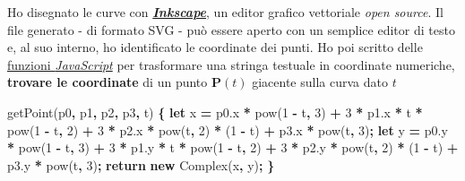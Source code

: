 \documentclass[
]{book}
\newenvironment{Shaded}{\begin{snugshade}}{\end{snugshade}}
\newcommand{\AttributeTok}[1]{\textcolor[rgb]{0.77,0.63,0.00}{#1}}
\newcommand{\ControlFlowTok}[1]{\textcolor[rgb]{0.13,0.29,0.53}{\textbf{#1}}}
\newcommand{\DecValTok}[1]{\textcolor[rgb]{0.00,0.00,0.81}{#1}}
\newcommand{\KeywordTok}[1]{\textcolor[rgb]{0.13,0.29,0.53}{\textbf{#1}}}
\newcommand{\NormalTok}[1]{#1}
\newcommand{\OperatorTok}[1]{\textcolor[rgb]{0.81,0.36,0.00}{\textbf{#1}}}
\newcommand{\VariableTok}[1]{\textcolor[rgb]{0.00,0.00,0.00}{#1}}
\begin{document}
Ho disegnato le curve con \href{https://inkscape.org/}{\emph{\textbf{Inkscape}}}, un editor grafico vettoriale \emph{open source}. Il file generato - di formato SVG - può essere aperto con un semplice editor di testo e, al suo interno, ho identificato le coordinate dei punti. Ho poi scritto delle \href{https://github.com/Bradwave/thesis}{funzioni \emph{JavaScript}} per trasformare una stringa testuale in coordinate numeriche, \textbf{trovare le coordinate} di un punto \(\mathbf{P}(t)\) giacente sulla curva dato \(t\)

\begin{Shaded}
\begin{Highlighting}[]
\AttributeTok{getPoint}\NormalTok{(p0}\OperatorTok{,}\NormalTok{ p1}\OperatorTok{,}\NormalTok{ p2}\OperatorTok{,}\NormalTok{ p3}\OperatorTok{,}\NormalTok{ t) }\OperatorTok{\{}
  \KeywordTok{let}\NormalTok{ x }\OperatorTok{=} \VariableTok{p0}\NormalTok{.}\AttributeTok{x} \OperatorTok{*} \AttributeTok{pow}\NormalTok{(}\DecValTok{1} \OperatorTok{-}\NormalTok{ t}\OperatorTok{,} \DecValTok{3}\NormalTok{) }\OperatorTok{+} \DecValTok{3} \OperatorTok{*} \VariableTok{p1}\NormalTok{.}\AttributeTok{x} \OperatorTok{*}\NormalTok{ t }\OperatorTok{*} \AttributeTok{pow}\NormalTok{(}\DecValTok{1} \OperatorTok{-}\NormalTok{ t}\OperatorTok{,} \DecValTok{2}\NormalTok{)}
    \OperatorTok{+} \DecValTok{3} \OperatorTok{*} \VariableTok{p2}\NormalTok{.}\AttributeTok{x} \OperatorTok{*} \AttributeTok{pow}\NormalTok{(t}\OperatorTok{,} \DecValTok{2}\NormalTok{) }\OperatorTok{*}\NormalTok{ (}\DecValTok{1} \OperatorTok{-}\NormalTok{ t) }\OperatorTok{+} \VariableTok{p3}\NormalTok{.}\AttributeTok{x} \OperatorTok{*} \AttributeTok{pow}\NormalTok{(t}\OperatorTok{,} \DecValTok{3}\NormalTok{)}\OperatorTok{;}
  \KeywordTok{let}\NormalTok{ y }\OperatorTok{=} \VariableTok{p0}\NormalTok{.}\AttributeTok{y} \OperatorTok{*} \AttributeTok{pow}\NormalTok{(}\DecValTok{1} \OperatorTok{-}\NormalTok{ t}\OperatorTok{,} \DecValTok{3}\NormalTok{) }\OperatorTok{+} \DecValTok{3} \OperatorTok{*} \VariableTok{p1}\NormalTok{.}\AttributeTok{y} \OperatorTok{*}\NormalTok{ t }\OperatorTok{*} \AttributeTok{pow}\NormalTok{(}\DecValTok{1} \OperatorTok{-}\NormalTok{ t}\OperatorTok{,} \DecValTok{2}\NormalTok{)}
    \OperatorTok{+} \DecValTok{3} \OperatorTok{*} \VariableTok{p2}\NormalTok{.}\AttributeTok{y} \OperatorTok{*} \AttributeTok{pow}\NormalTok{(t}\OperatorTok{,} \DecValTok{2}\NormalTok{) }\OperatorTok{*}\NormalTok{ (}\DecValTok{1} \OperatorTok{-}\NormalTok{ t) }\OperatorTok{+} \VariableTok{p3}\NormalTok{.}\AttributeTok{y} \OperatorTok{*} \AttributeTok{pow}\NormalTok{(t}\OperatorTok{,} \DecValTok{3}\NormalTok{)}\OperatorTok{;}
  \ControlFlowTok{return} \KeywordTok{new} \AttributeTok{Complex}\NormalTok{(x}\OperatorTok{,}\NormalTok{ y)}\OperatorTok{;}
\OperatorTok{\}}
\end{Highlighting}
\end{Shaded}
\end{document}
